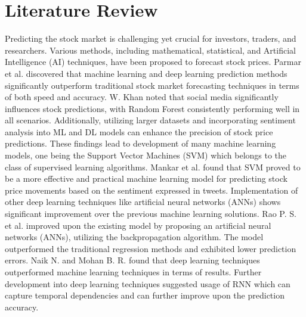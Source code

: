 \section{Literature Review}
Predicting the stock market is challenging yet crucial for investors, traders, and researchers. Various methods, including mathematical, statistical, and Artificial Intelligence (AI) techniques, have been proposed to forecast stock prices. Parmar et al. \cite{parmar2018stock} discovered that machine learning and deep learning prediction methods significantly outperform traditional stock market forecasting techniques in terms of both speed and accuracy. W. Khan \cite{khan2022stock} noted that social media significantly influences stock predictions, with Random Forest consistently performing well in all scenarios. Additionally, utilizing larger datasets and incorporating sentiment analysis into ML and DL models can enhance the precision of stock price predictions. These findings lead to development of many machine learning models, one being the Support Vector Machines (SVM) which belongs to the class of  supervised learning algorithms. Mankar et al. \cite{mankar2018stock} found that SVM proved to be a more effective and practical machine learning model for predicting stock price movements based on the sentiment expressed in tweets. Implementation of other deep learning techniques like artificial neural networks (ANNs) shows significant improvement over the previous machine learning solutions. Rao P. S. et al. \cite{rao2020survey} improved upon the existing model by proposing an artificial neural networks (ANNs), utilizing the backpropagation algorithm. The model outperformed the traditional regression methods and exhibited lower prediction errors. Naik N. and Mohan B. R. \cite{nikou2019stock} found that deep learning techniques outperformed machine learning techniques in terms of results. Further development into deep learning techniques suggested usage of RNN which can capture temporal dependencies and can further improve upon the prediction accuracy. 

